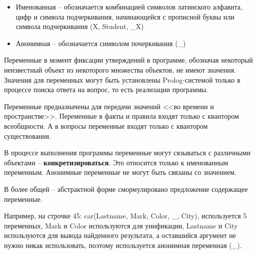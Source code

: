 \begin{enumerate}
    \begin{itemize}
        \item Именованная -- обозначается комбинацией символов латинского алфавита, цифр и символа подчеркивания, начинающейся с прописной буквы или символа подчеркивания (X, Student, \_X)
        \item Анонимная -- обозначается символом почеркивания (\_)
    \end{itemize}

    Переменные в момент фиксации утверждений в программе, обозначая некоторый неизвестный объект из некоторого множества объектов, не имеют значения. Значения для переменных могут быть установлены Prolog-системой только в процессе поиска ответа на вопрос, то есть реализации программы.

    Переменные предназначены для передачи значений <<во времени и пространстве>>. Переменные в факты и правила входят только с квантором всеобщности. А в вопросы переменные входят только с квантором существования.

    В процессе выполнения программы переменные могут сязываться с различными объектами -- \textbf{конкретизироваться}. Это относится только к именованным переменным. Анонимные переменные не могут быть связаны со значением.

    В более общей -- абстрактной форме смормулировано предложение содержащее переменные.

    Например, на строчке 45: car(Lastname, Mark, Color, \_, City), используется 5 переменных, Mark и Color используются для унификации, Lastname и City используются для вывода найденного результата, а оставшийся аргумент не нужно никак использовать, поэтому используется анонимная переменная (\_).
\end{enumerate}
